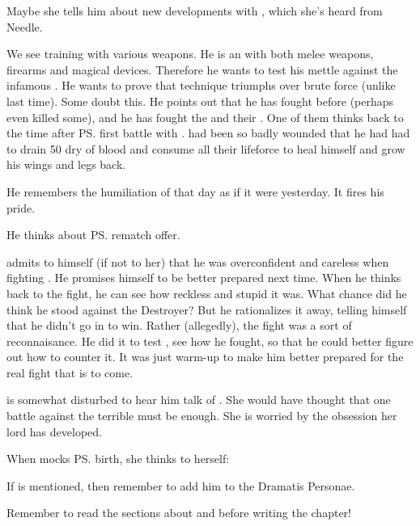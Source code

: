 Maybe she tells him about new developments with \Tiroco, which she's heard from Needle. 

We see \Teshrial{} training with various weapons. 
He is an  with both melee weapons, firearms and magical devices. 
Therefore he wants to test his mettle against the infamous \Ishnaruchaefir. 
He wants to prove that technique triumphs over brute force ({unlike} last time). 
Some \resphain{} doubt this. 
He points out that he has fought \dragons{} before (perhaps even killed some), and he has fought the \Baelzerach{} and their \daemons. 
One of them thinks back to the time after \ps{\Teshrial} first battle with \Ishnaruchaefir. 
\Teshrial{} had been so badly wounded that he had had to drain 50 \humans{} dry of blood and consume all their lifeforce to heal himself and grow his wings and legs back.  

He remembers the humiliation of that day as if it were yesterday. 
It fires his pride. 

He thinks about {\ps{\Ishnaruchaefir} rematch offer}. 

\Teshrial{} admits to himself (if not to her) that he was overconfident and careless when fighting \Ishnaruchaefir{}. 
He promises himself to be better prepared next time. 
When he thinks back to the fight, he can see how reckless and stupid it was. 
What chance did he think he stood against the Destroyer? 
But he rationalizes it away, telling himself that he didn't go in to win. 
Rather (allegedly), the fight was a sort of reconnaisance. 
He did it to test \Ishnaruchaefir, see how he fought, so that he could better figure out how to counter it. 
It was just warm-up to make him better prepared for the real fight that is to come. 

\Achsah{} is somewhat disturbed to hear him talk of . 
She would have thought that one battle against the terrible \Ishnaruchaefir{} must be enough. 
She is worried by the obsession her lord has developed. 

When \Teshrial{} mocks \ps{\Achsah} birth, she thinks to herself: 
  
If \Thanatzil{} is mentioned, then remember to add him to the Dramatis Personae. 

Remember to read the sections about  and  before writing the chapter!








